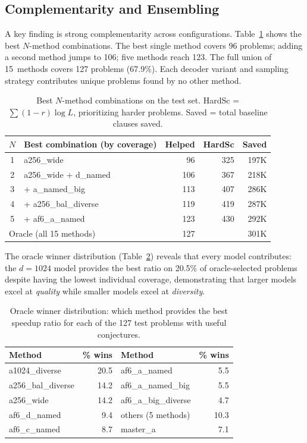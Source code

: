 \documentclass{easychair}
\begin{document}
\subsection{Complementarity and Ensembling}

A key finding is strong complementarity across configurations.
Table~\ref{tab:combos} shows the best $N$-method combinations.  The
best single method covers 96 problems; adding a second method jumps to
106; five methods reach 123.  The full union of 15~methods covers 127
problems (67.9\%).  Each decoder variant and sampling strategy
contributes unique problems found by no other method.

\begin{table}[t]
\centering
\caption{Best $N$-method combinations on the test set.
  HardSc = $\sum (1{-}r)\log L$, prioritizing harder problems.
  Saved = total baseline clauses saved.}
\label{tab:combos}
\small
\begin{tabular}{clrrr}
\toprule
$N$ & Best combination (by coverage) & Helped & HardSc & Saved \\
\midrule
1 & a256\_wide                          & 96  & 325 & 197K \\
2 & a256\_wide + d\_named               & 106 & 367 & 218K \\
3 & + a\_named\_big                     & 113 & 407 & 286K \\
4 & + a256\_bal\_diverse                 & 119 & 419 & 287K \\
5 & + af6\_a\_named                      & 123 & 430 & 292K \\
\midrule
\multicolumn{2}{l}{Oracle (all 15 methods)} & 127 & & 301K \\
\bottomrule
\end{tabular}
\end{table}

The oracle winner distribution (Table~\ref{tab:oracle}) reveals that
every model contributes: the $d{=}1024$ model provides the best
ratio on 20.5\% of oracle-selected problems despite having the lowest
individual coverage, demonstrating that larger models excel at
\emph{quality} while smaller models excel at \emph{diversity}.

\begin{table}[t]
\centering
\caption{Oracle winner distribution: which method provides the best
  speedup ratio for each of the 127 test problems with useful conjectures.}
\label{tab:oracle}
\small
\begin{tabular}{lr|lr}
\toprule
Method & \% wins & Method & \% wins \\
\midrule
a1024\_diverse & 20.5 & af6\_a\_named & 5.5 \\
a256\_bal\_diverse & 14.2 & af6\_a\_named\_big & 5.5 \\
a256\_wide & 14.2 & af6\_a\_big\_diverse & 4.7 \\
af6\_d\_named & 9.4 & others (5 methods) & 10.3 \\
af6\_c\_named & 8.7 & master\_a & 7.1 \\
\bottomrule
\end{tabular}
\end{table}
\end{document}
